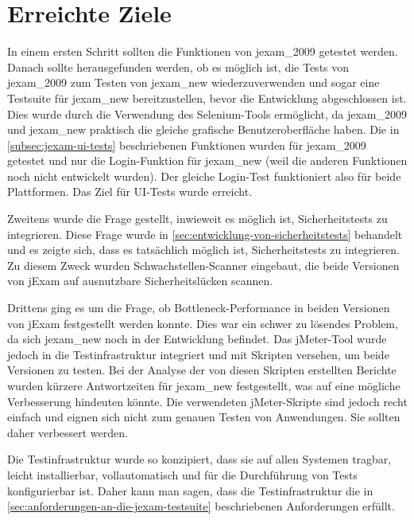 \section{Erreichte Ziele}

In einem ersten Schritt sollten die Funktionen von \gls{jexam_2009}
getestet werden. Danach sollte herausgefunden werden, ob es möglich 
ist, die Tests von \gls{jexam_2009} zum Testen von \gls{jexam_new} 
wiederzuverwenden und sogar eine Testsuite für \gls{jexam_new} 
bereitzustellen, bevor die Entwicklung abgeschlossen ist. Dies wurde
durch die Verwendung des Selenium-Tools ermöglicht, da 
\gls{jexam_2009} und \gls{jexam_new} praktisch die gleiche grafische 
Benutzeroberfläche haben. Die in \autoref{subsec:jexam-ui-tests} beschriebenen
Funktionen wurden für \gls{jexam_2009} getestet und nur die Login-Funktion
für \gls{jexam_new} (weil die anderen Funktionen noch nicht entwickelt
wurden). Der gleiche Login-Test funktioniert also für beide
Plattformen. Das Ziel für UI-Tests wurde erreicht.

Zweitens wurde die Frage gestellt, inwieweit es möglich ist,
Sicherheitstests zu integrieren. Diese Frage wurde in
\autoref{sec:entwicklung-von-sicherheitstests} behandelt und es
zeigte sich, dass es tatsächlich möglich ist,
Sicherheitstests zu integrieren. Zu diesem Zweck wurden
Schwachstellen-Scanner eingebaut, die beide Versionen von jExam
auf ausnutzbare Sicherheitslücken scannen.


Drittens ging es um die Frage, ob Bottleneck-Performance in beiden
Versionen von jExam festgestellt werden konnte. Dies war ein schwer
zu lösendes Problem, da sich \gls{jexam_new} noch in der Entwicklung
befindet. Das jMeter-Tool wurde jedoch in die Testinfrastruktur
integriert und mit Skripten versehen, um beide Versionen zu testen.
Bei der Analyse der von diesen Skripten erstellten Berichte wurden
kürzere Antwortzeiten für \gls{jexam_new} festgestellt, was auf eine
mögliche Verbesserung hindeuten könnte. Die verwendeten jMeter-Skripte
sind jedoch recht einfach und eignen sich nicht zum genauen Testen
von Anwendungen. Sie sollten daher verbessert werden.


Die Testinfrastruktur wurde so konzipiert, dass sie auf allen
Systemen tragbar, leicht installierbar, vollautomatisch und für
die Durchführung von Tests konfigurierbar ist. Daher kann man
sagen, dass die Testinfrastruktur die in
\autoref{sec:anforderungen-an-die-jexam-testsuite} beschriebenen
Anforderungen erfüllt.




